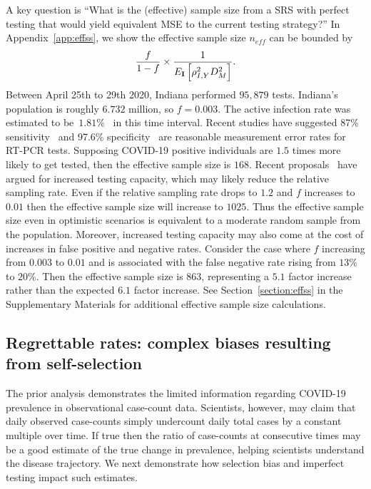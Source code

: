 \documentclass[11pt]{amsart}
\numberwithin{equation}{section}
\theoremstyle{plain}
\def\I{\bf I}
\begin{document}
 A key question is ``What is the (effective) sample size from a SRS with perfect testing that would yield equivalent MSE to the current testing strategy?'' In Appendix~\ref{app:effss}, we show the effective sample size $n_{eff}$ can be bounded by
 $$
 \frac{f}{1-f} \times \frac{1}{E_{\I} \left[ \rho_{I,Y}^2 D_M^2 \right]}.
 $$
 Between April 25th to 29th 2020, Indiana performed $95,879$ tests.  Indiana's population is roughly $6.732$ million, so $f = 0.003$.  The active infection rate was estimated to be~$1.81\%$~\citep{Yiannoutsos2021} in this time interval. Recent studies have suggested 87\% sensitivity~\citep{Arevalo2020} and 97.6\% specificity~\citep{Cohen2020} are reasonable measurement error rates for RT-PCR tests. Supposing COVID-19 positive individuals are $1.5$ times more likely to get tested, then the effective sample size is $168$. Recent proposals~\citep{Siddarth2020} have argued for increased testing capacity, which may likely reduce the relative sampling rate.  Even if the relative sampling rate drops to $1.2$ and $f$ increases to $0.01$ then the effective sample size will increase to $1025$.  Thus the effective sample size even in optimistic scenarios is equivalent to a moderate random sample from the population.  Moreover, increased testing capacity may also come at the cost of increases in false positive and negative rates.  Consider the case where $f$ increasing from $0.003$ to $0.01$ and is associated with the false negative rate rising from $13\%$ to $20$\%.  Then the effective sample size is $863$, representing a $5.1$ factor increase rather than the expected $6.1$ factor increase. See Section~\ref{section:effss} in the Supplementary Materials for additional effective sample size calculations.


 \subsection{Regrettable rates: complex biases resulting from self-selection}
 \label{section:rates}

 The prior analysis demonstrates the limited information regarding COVID-19 prevalence in observational case-count data.  Scientists, however, may claim that daily observed case-counts simply undercount daily total cases by a constant multiple over time.  If true then the ratio of case-counts at consecutive times may be a good estimate of the true change in prevalence, helping scientists understand the disease trajectory.  We next demonstrate how selection bias and imperfect testing impact such estimates.
\end{document}
